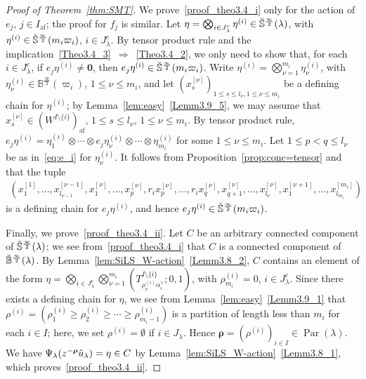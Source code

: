 \documentclass[ALCO,ThmDefs,Unicode,epreuves]{cedram}
\newcommand\bm[1]{\boldsymbol{#1}}
\newcommand\bmrho[1]{\boldsymbol{#1}}
\newcommand{\si}{\frac{\infty}{2}}
\DeclareMathOperator{\af}{af}
\DeclareMathOperator{\Par}{Par}
\begin{document}
\begin{proof}[Proof of Theorem~\ref{thm:SMT}]
We prove~\ref{proof_theo3.4_i} only for the action of $e_j$, $j \in I_{\af}$; 
the proof for $f_j$ is similar. 
Let 
$\eta = \bigotimes_{i \in J_{\lambda}^c} \eta^{(i)}\in \Breve{\mathbb{S}}^{\si}(\lambda)$, 
with 
$\eta^{(i)}\in \Breve{\mathbb{S}}^{\si}(m_i \varpi_i)$, 
$i \in J_{\lambda}^c$. 
By tensor product rule 
and the implication~\ref{Theo3.4_3}~$\Rightarrow $~\ref{Theo3.4_2}, 
we only need to show that, for each 
$i \in J_{\lambda}^c$, 
if 
$e_j \eta^{(i)} \neq \bm{0}$, 
then 
$e_j \eta^{(i)} \in \Breve{\mathbb{S}}^{\si}(m_i \varpi_i)$. 
Write 
$\eta^{(i)} = \bigotimes_{\nu = 1}^{m_i} \eta^{(i)}_{\nu}$, 
with 
$\eta^{(i)}_{\nu} \in \mathbb{B}^{\si}(\varpi_i)$, 
$1 \leq \nu \leq m_i$, 
and let
$(x^{[\nu]}_s)_{1 \leq s \leq l_{\nu}, 1 \leq \nu \leq m_i}$
be a defining chain for 
$\eta^{(i)}$; 
by Lemma~\ref{lem:easy}~\ref{Lemm3.9_5}, 
we may assume that 
$x^{[\nu]}_s \in (W^{I \setminus \{ i \}})_{\af}$, 
$1 \leq s \leq l_{\nu}$, 
$1 \leq \nu \leq m_i$.
By tensor product rule, 
$e_j \eta^{(i)} = 
\eta^{(i)}_1 \otimes \cdots \otimes e_j \eta^{(i)}_{\nu} \otimes \cdots \otimes \eta^{(i)}_{m_i}$
for some
$1 \leq \nu \leq m_i$. 
Let 
$1 \leq p < q \leq l_{\nu}$
be as in~\eqref{eq:e_i} for $\eta^{(i)}_{\nu}$. 
It follows from 
Proposition~\ref{prop:conc=tensor} 
and~\cite[Lemma~4.1.6]{INS16} 
that the tuple
\begin{align}
\left( 
x^{[1]}_1 , \ldots , x^{[\nu-1]}_{l_{\nu -1}}, 
x^{[\nu]}_1 , \ldots , x^{[\nu]}_p , r_i x^{[\nu]}_p , \ldots , 
r_i x^{[\nu]}_q , x^{[\nu]}_{q+1} , \ldots , x^{[\nu]}_{l_{\nu}} , 
x^{[\nu +1]}_1 , \ldots , x^{[m_i]}_{l_{m_i}}
\right)
\end{align}
is a defining chain for 
$e_j \eta^{(i)}$, 
and hence 
$e_j \eta^{(i)} \in \Breve{\mathbb{S}}^{\si}(m_i \varpi_i)$. 

Finally, we prove~\ref{proof_theo3.4_ii}. 
Let 
$C$ 
be an arbitrary connected component of 
$\Breve{\mathbb{S}}^{\si}(\lambda)$; 
we see from~\ref{proof_theo3.4_i} that 
$C$ 
is a connected component of 
$\Breve{\mathbb{B}}^{\si}(\lambda)$. 
By Lemma~\ref{lem:SiLS_W-action}~\ref{Lemm3.8_2}, 
$C$ 
contains an element of the form 
$\eta = \bigotimes_{i \in J_{\lambda}^c} \bigotimes_{\nu = 1}^{m_i} \left(T^{I \setminus \{ i \}}_{\rho^{(i)}_{\nu} \alpha_i^{\vee}};0,1 \right)$, 
with 
$\rho^{(i)}_{m_i} = 0$, 
$i \in J_{\lambda}^c$. 
Since there exists a defining chain for $\eta$, 
we see from Lemma~\ref{lem:easy}~\ref{Lemm3.9_1} that 
$\rho^{(i)} = (\rho^{(i)}_1 \geq \rho^{(i)}_2 \geq \cdots \geq \rho^{(i)}_{m_i -1})$
is a partition of length less than $m_i$ 
for each $i \in I$; 
here, we set 
$\rho^{(i)} = \emptyset$ 
if 
$i \in J_{\lambda}$. 
Hence 
$\bmrho{\rho} = (\rho^{(i)})_{i \in I} \in \Par (\lambda)$. 
We have 
$\Psi_{\lambda}(z^{-\bmrho{\rho}} \Tilde{u}_{\lambda}) = \eta \in C$
by Lemma~\ref{lem:SiLS_W-action}~\ref{Lemm3.8_1}, 
which proves~\ref{proof_theo3.4_ii}. 
\end{proof}
\end{document}
